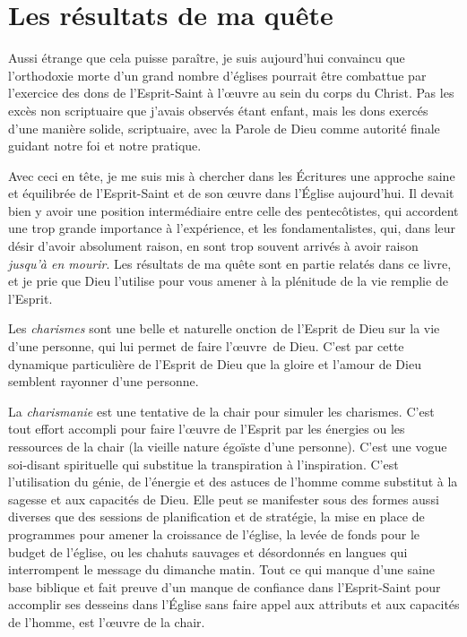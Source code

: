 \section{Les r\'esultats de ma qu\^ete}

Aussi étrange que cela puisse paraître, je suis aujour\-d'hui convaincu que
 l'orthodoxie morte d'un grand nombre d'églises pourrait être combattue par l'exercice des
 dons de l'Esprit-Saint à l'œuvre au sein du corps du Christ. Pas les excès non scriptuaire que
 j'avais observés étant enfant, mais les dons exercés d'une manière solide,
 scriptuaire, avec la Parole de Dieu comme autorité finale guidant notre foi et
 notre pratique.

Avec ceci en tête, je me suis mis à chercher dans les Écritures une
 approche saine et équilibrée de l'Esprit-Saint et de son œuvre dans l'Église
 aujourd'hui. Il devait bien y avoir une position inter\-mé\-di\-aire entre celle des
 pentecôtistes, qui accordent une trop grande importance à l'ex\-pé\-rience, et les
 fondamentalistes, qui, dans leur désir d'avoir absolument raison,
 en sont trop souvent arrivés à avoir raison \emph{jusqu'à en mourir}.
 Les résultats de ma quête sont en partie relatés dans ce livre, et je prie que
 Dieu l'utilise pour vous amener à la plénitude de la vie remplie de
 l'Esprit.

Les \emph{charismes} sont une belle et naturelle onction de l'Esprit de Dieu
 sur la vie d'une personne, qui lui permet de faire l'œuvre~de Dieu. C'est par
 cette dynamique particulière de l'Esprit de Dieu que la gloire et l'amour de Dieu
 semblent rayonner d'une personne.

La \emph{charismanie} est une tentative de la chair pour simuler les charismes.
 C'est tout effort accompli pour faire l'œuvre de l'Esprit par les énergies ou les
 ressources de la chair (la vieille nature égoïste d'une personne). C'est
 une vogue soi-disant spirituelle qui substitue la transpiration à l'inspiration. C'est
 l'utilisation du génie, de l'énergie et des astuces de l'homme comme substitut
 à la sagesse et aux capacités de Dieu. Elle peut se manifester sous des formes
 aussi diverses que des sessions de planification et de stratégie, la mise en place de
 programmes pour amener la croissance de l'église, la levée de fonds
 pour le budget de l'église, ou les chahuts sauvages et désordonnés en langues
 qui interrompent le message du dimanche matin. Tout ce qui manque d'une saine base
 biblique et fait preuve d'un manque de confiance dans l'Esprit-Saint pour
 accomplir ses desseins dans l'Église sans faire appel aux attributs
 et aux capacités de l'homme, est l'œuvre de la chair.

